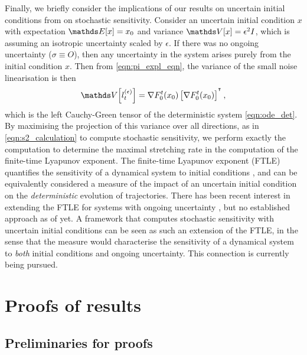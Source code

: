 Finally, we briefly consider the implications of our results on uncertain initial conditions from  on stochastic sensitivity.
Consider an uncertain initial condition \(x\) with expectation \(\avg{x} = x_0\) and variance \(\var{x} = \epsilon^2 I\), which is assuming an isotropic uncertainty scaled by \(\epsilon\).
If there was no ongoing uncertainty (\(\sigma \equiv O\)), then any uncertainty in the system arises purely from the initial condition \(x\).
Then from \eqref{eqn:pi_expl_eqn}, the variance of the small noise linearisation is then
\[
	\var{l_t^{(\epsilon)}} = \nabla F_0^t\!\left(x_0\right)\left[\nabla F_0^t\!\left(x_0\right)\right]^{\T},
\]
which is the left Cauchy-Green tensor of the deterministic system \eqref{eqn:ode_det}.
By maximising the projection of this variance over all directions, as in \eqref{eqn:s2_calculation} to compute stochastic sensitivity, we perform exactly the computation to determine the maximal stretching rate in the computation of the finite-time Lyapunov exponent.
The finite-time Lyapunov exponent (FTLE) quantifies the sensitivity of a dynamical system to initial conditions \cite{ShaddenEtAl_2005_DefinitionPropertiesLagrangian}, and can be equivalently considered a measure of the impact of an uncertain initial condition on the \emph{deterministic} evolution of trajectories.
There has been recent interest in extending the FTLE for systems with ongoing uncertainty \cite{Balasuriya_2020_UncertaintyFinitetimeLyapunov,YouLeung_2021_ComputingFiniteTime,GuoEtAl_2016_FiniteTimeLyapunovExponents}, but no established approach as of yet.
A framework that computes stochastic sensitivity with uncertain initial conditions can be seen as such an extension of the FTLE, in the sense that the measure would characterise the sensitivity of a dynamical system to \emph{both} initial conditions and ongoing uncertainty.
This connection is currently being pursued.




\section{Proofs of results}
\subsection{Preliminaries for proofs}\label{app:gauss}

